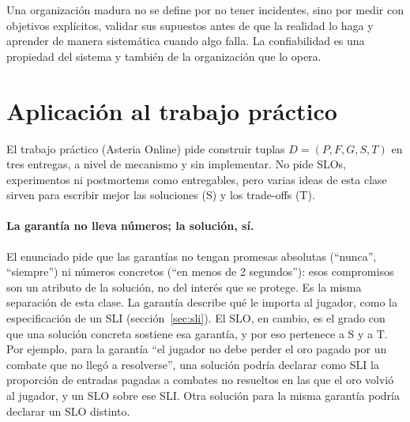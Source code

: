 \documentclass[variant=apuntes,cover=institutional,mode=screen]{ua-engineering-v6-article}
\begin{document}
\begin{uakeybox}
Una organización madura no se define por no tener incidentes, sino por medir con objetivos explícitos, validar sus supuestos antes de que la realidad lo haga y aprender de manera sistemática cuando algo falla. La confiabilidad es una propiedad del sistema y también de la organización que lo opera.
\end{uakeybox}

\section{Aplicación al trabajo práctico}

El trabajo práctico (Asteria Online) pide construir tuplas $D = (P, F, G, S, T)$ en tres entregas, a nivel de mecanismo y sin implementar. No pide SLOs, experimentos ni postmortems como entregables, pero varias ideas de esta clase sirven para escribir mejor las soluciones (S) y los trade-offs (T).

\paragraph{La garantía no lleva números; la solución, sí.} El enunciado pide que las garantías no tengan promesas absolutas (``nunca'', ``siempre'') ni números concretos (``en menos de 2 segundos''): esos compromisos son un atributo de la solución, no del interés que se protege. Es la misma separación de esta clase. La garantía describe qué le importa al jugador, como la especificación de un SLI (sección~\ref{sec:sli}). El SLO, en cambio, es el grado con que una solución concreta sostiene esa garantía, y por eso pertenece a S y a T. Por ejemplo, para la garantía ``el jugador no debe perder el oro pagado por un combate que no llegó a resolverse'', una solución podría declarar como SLI la proporción de entradas pagadas a combates no resueltos en las que el oro volvió al jugador, y un SLO sobre ese SLI. Otra solución para la misma garantía podría declarar un SLO distinto.
\end{document}
